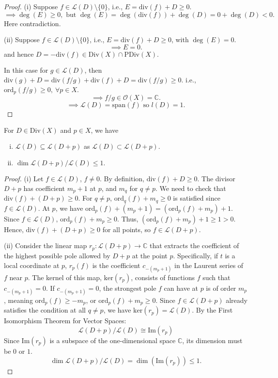 \documentclass{article}
\begin{document}
\begin{proof}
(i) Suppose $f \in \mathcal{L}(D) \setminus \{0\}$, i.e., $E = \mathrm{div}(f) + D \ge 0$.
$$ \implies \deg(E) \ge 0, \text{ but } \deg(E) = \deg(\mathrm{div}(f)) + \deg(D) = 0 + \deg(D) < 0. $$
Here contradiction.

(ii) Suppose $f \in \mathcal{L}(D) \setminus \{0\}$, i.e., $E = \mathrm{div}(f) + D \ge 0$, with $\deg(E) = 0$.
$$ \implies E = 0. $$
and hence $D = -\mathrm{div}(f) \in \mathrm{Div}(X) \cap \mathrm{PDiv}(X)$.

In this case for $g \in \mathcal{L}(D)$, then $\mathrm{div}(g) + D = \mathrm{div}(f/g) + \mathrm{div}(f) + D = \mathrm{div}(f/g) \ge 0$.
i.e., $\mathrm{ord}_p(f/g) \ge 0, \ \forall p \in X$.
$$ \implies f/g \in \mathcal{O}(X) = \mathbb{C}. $$
$$ \implies \mathcal{L}(D) = \mathrm{span}(f) \text{ so } l(D) = 1. $$
\end{proof}

\begin{proposition}
For $D \in \mathrm{Div}(X)$ and $p \in X$, we have
\begin{enumerate}[(i)]
    \item $\mathcal{L}(D) \subseteq \mathcal{L}(D+p)$ as $\mathcal{L}(D) \subset \mathcal{L}(D+p)$.
    \item $\dim \mathcal{L}(D+p)/\mathcal{L}(D) \le 1$.
\end{enumerate}
\end{proposition}

\begin{proof}
(i) Let $f \in \mathcal{L}(D)$, $f \ne 0$. By definition, $\mathrm{div}(f) + D \ge 0$.
The divisor $D+p$ has coefficient $m_p+1$ at $p$, and $m_q$ for $q \ne p$.
We need to check that $\mathrm{div}(f) + (D+p) \ge 0$.
For $q \ne p$, $\mathrm{ord}_q(f) + m_q \ge 0$ is satisfied since $f \in \mathcal{L}(D)$.
At $p$, we have $\mathrm{ord}_p(f) + (m_p+1) = (\mathrm{ord}_p(f) + m_p) + 1$.
Since $f \in \mathcal{L}(D)$, $\mathrm{ord}_p(f) + m_p \ge 0$.
Thus, $(\mathrm{ord}_p(f) + m_p) + 1 \ge 1 > 0$.
Hence, $\mathrm{div}(f) + (D+p) \ge 0$ for all points, so $f \in \mathcal{L}(D+p)$.

(ii) Consider the linear map $r_p: \mathcal{L}(D+p) \to \mathbb{C}$ that extracts the coefficient of the highest possible pole allowed by $D+p$ at the point $p$. Specifically, if $t$ is a local coordinate at $p$, $r_p(f)$ is the coefficient $c_{-(m_p+1)}$ in the Laurent series of $f$ near $p$.
The kernel of this map, $\mathrm{ker}(r_p)$, consists of functions $f$ such that $c_{-(m_p+1)} = 0$.
If $c_{-(m_p+1)} = 0$, the strongest pole $f$ can have at $p$ is of order $m_p$, meaning $\mathrm{ord}_p(f) \ge -m_p$, or $\mathrm{ord}_p(f) + m_p \ge 0$.
Since $f \in \mathcal{L}(D+p)$ already satisfies the condition at all $q \ne p$, we have $\mathrm{ker}(r_p) = \mathcal{L}(D)$.
By the First Isomorphism Theorem for Vector Spaces:
$$ \mathcal{L}(D+p) / \mathcal{L}(D) \cong \mathrm{Im}(r_p) $$
Since $\mathrm{Im}(r_p)$ is a subspace of the one-dimensional space $\mathbb{C}$, its dimension must be $0$ or $1$.
$$ \dim \mathcal{L}(D+p)/\mathcal{L}(D) = \dim(\mathrm{Im}(r_p)) \le 1. $$
\end{proof}
\end{document}
